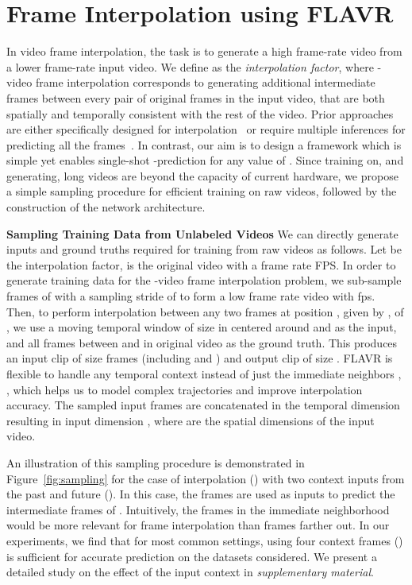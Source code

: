 \documentclass[10pt,twocolumn,letterpaper]{article}
\newcommand{\figref}[1]{Figure~\ref{#1}}
\newcommand{\Ours}{FLAVR}
\newcommand{\twox}{}
\newcommand{\fourx}{}
\begin{document}
\section{Frame Interpolation using \Ours{}}
\label{sec:arch_design}

In video frame interpolation, the task is to generate a high frame-rate video from a lower frame-rate input video. We define  as the \textit{interpolation factor}, where -video frame interpolation corresponds to generating  additional intermediate frames between every pair of original frames in the input video, that are both spatially and temporally consistent with the rest of the video. Prior approaches are either specifically designed for \twox{} interpolation~\cite{choi2020channel, lee2020adacof, huang2020rife, tulyakov2021time, siyao2021deep} or require multiple inferences for predicting all the  frames~\cite{xu2019quadratic, bao2019depth, bao2019memc, park2020bmbc}. In contrast, our aim is to design a framework which is simple yet enables single-shot -prediction for any value of . Since training on, and generating, long videos are beyond the capacity of current hardware, we propose a simple sampling procedure for efficient training on raw videos, followed by the construction of the network architecture.

{\bf Sampling Training Data from Unlabeled Videos} We can directly generate inputs and ground truths required for training from raw videos as follows. Let  be the interpolation factor,  is the original video with a frame rate  FPS. In order to generate training data for the -video frame interpolation problem, we sub-sample frames of  with a sampling stride of  to form a low frame rate video  with  fps. Then, to perform interpolation between any two frames at position , given by , of , we use a moving temporal window of size  in  centered around  and  as the input, and all frames between  and  in original video  as the ground truth. This produces an input clip of size  frames (including  and ) and output clip of size . 
\Ours{} is flexible to handle any temporal context  instead of just the immediate neighbors , , which helps us to model complex trajectories and improve interpolation accuracy. 
The sampled input frames are concatenated in the temporal dimension resulting in input dimension , where  are the spatial dimensions of the input video. 


An illustration of this sampling procedure is demonstrated in \figref{fig:sampling} for the case of \fourx{} interpolation () with two context inputs from the past and future (). In this case, the frames  are used as inputs to predict the  intermediate frames of . Intuitively, the frames in the immediate neighborhood would be more relevant for frame interpolation than frames farther out.
In our experiments, we find that for most common settings, using four context frames () is sufficient for accurate prediction on the datasets considered. 
We present a detailed study on the effect of the input context  in \textit{supplementary material}.
\end{document}
